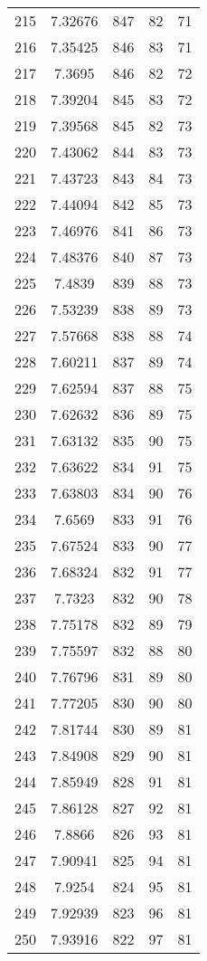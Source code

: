 \documentclass[12pt,a4paper]{article}
\begin{document}
\begin{tabular}{r|cccc}
	215 & 7.32676 & 847 & 82 & 71 \\
	216 & 7.35425 & 846 & 83 & 71 \\
	217 & 7.3695 & 846 & 82 & 72 \\
	218 & 7.39204 & 845 & 83 & 72 \\
	219 & 7.39568 & 845 & 82 & 73 \\
	220 & 7.43062 & 844 & 83 & 73 \\
	221 & 7.43723 & 843 & 84 & 73 \\
	222 & 7.44094 & 842 & 85 & 73 \\
	223 & 7.46976 & 841 & 86 & 73 \\
	224 & 7.48376 & 840 & 87 & 73 \\
	225 & 7.4839 & 839 & 88 & 73 \\
	226 & 7.53239 & 838 & 89 & 73 \\
	227 & 7.57668 & 838 & 88 & 74 \\
	228 & 7.60211 & 837 & 89 & 74 \\
	229 & 7.62594 & 837 & 88 & 75 \\
	230 & 7.62632 & 836 & 89 & 75 \\
	231 & 7.63132 & 835 & 90 & 75 \\
	232 & 7.63622 & 834 & 91 & 75 \\
	233 & 7.63803 & 834 & 90 & 76 \\
	234 & 7.6569 & 833 & 91 & 76 \\
	235 & 7.67524 & 833 & 90 & 77 \\
	236 & 7.68324 & 832 & 91 & 77 \\
	237 & 7.7323 & 832 & 90 & 78 \\
	238 & 7.75178 & 832 & 89 & 79 \\
	239 & 7.75597 & 832 & 88 & 80 \\
	240 & 7.76796 & 831 & 89 & 80 \\
	241 & 7.77205 & 830 & 90 & 80 \\
	242 & 7.81744 & 830 & 89 & 81 \\
	243 & 7.84908 & 829 & 90 & 81 \\
	244 & 7.85949 & 828 & 91 & 81 \\
	245 & 7.86128 & 827 & 92 & 81 \\
	246 & 7.8866 & 826 & 93 & 81 \\
	247 & 7.90941 & 825 & 94 & 81 \\
	248 & 7.9254 & 824 & 95 & 81 \\
	249 & 7.92939 & 823 & 96 & 81 \\
	250 & 7.93916 & 822 & 97 & 81 \\

\end{tabular}
\end{document}

